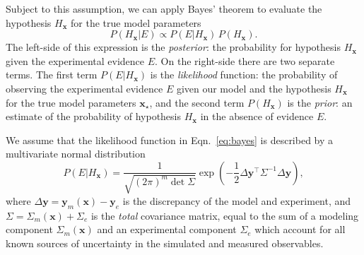 \documentclass[aps,prc,reprint,amsmath,nofootinbib]{revtex4-1}
\newcommand{\x}{\mathbf{x}}
\newcommand{\y}{\mathbf{y}}
\begin{document}
Subject to this assumption, we can apply Bayes' theorem to evaluate the hypothesis $H_\x$ for the true model parameters
\begin{equation}
  \label{eq:bayes}
  P(H_\x | E) \propto P(E | H_\x)\, P(H_\x).
\end{equation}
The left-side of this expression is the \emph{posterior}: the probability for hypothesis $H_\x$ given the experimental evidence $E$.
On the right-side there are two separate terms.
The first term $P(E | H_\x)$ is the \emph{likelihood} function: the probability of observing the experimental evidence $E$ given our model and the hypothesis $H_\x$ for the true model parameters $\x_\star$, and the second term $P(H_\x)$ is the \emph{prior}: an estimate of the probability of hypothesis $H_\x$ in the absence of evidence $E$.

We assume that the likelihood function in Eqn.~\eqref{eq:bayes} is described by a multivariate normal distribution
\begin{equation}
  \label{eq:likelihood}
  P(E | H_\x) = \frac{1}{\sqrt{(2\pi)^m \det \Sigma}} \exp \left ( -\frac{1}{2}\Delta\y^\intercal \Sigma^{-1} \Delta\y \right ),
\end{equation}
where $\Delta\y = \y_m(\x) - \y_e$ is the discrepancy of the model and experiment, and $\Sigma = \Sigma_m(\x) + \Sigma_e$ is the \emph{total} covariance matrix, equal to the sum of a modeling component $\Sigma_m(\x)$ and an experimental component $\Sigma_e$ which account for all known sources of uncertainty in the simulated and measured observables.
\end{document}
